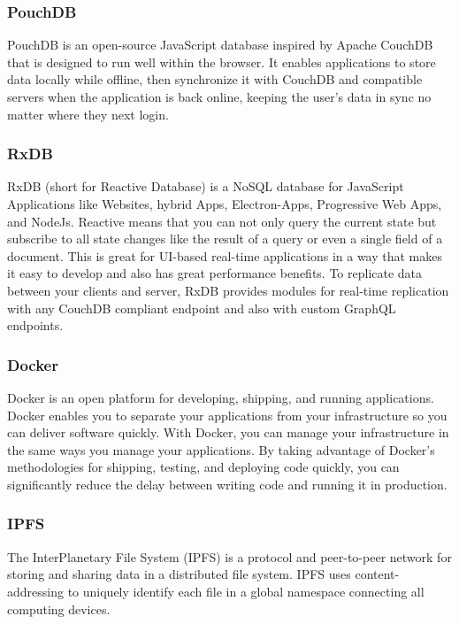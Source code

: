     \subsubsection{PouchDB}
    PouchDB is an open-source JavaScript database inspired by Apache CouchDB 
    that is designed to run well within the browser.
    It enables applications to store data locally while offline, 
    then synchronize it with CouchDB and compatible servers when the application is back online, keeping the user's data in sync 
    no matter where they next login.

    \subsubsection{RxDB}
    RxDB (short for Reactive Database) is a NoSQL database for JavaScript Applications like Websites, 
    hybrid Apps, Electron-Apps, Progressive Web Apps, and NodeJs. Reactive means that you can not only query the current state but subscribe to all state changes like the result of a query or even a 
    single field of a document. This is great for UI-based real-time applications in a way that makes it easy to develop and also has great performance benefits. To replicate data between your clients and server,
    RxDB provides modules for real-time replication with any CouchDB compliant endpoint and also with custom GraphQL endpoints. 

    \subsubsection{Docker}
    Docker is an open platform for developing, shipping, and running applications. 
    Docker enables you to separate your applications from your infrastructure so you can deliver software quickly. 
    With Docker, you can manage your infrastructure in the same ways you manage your applications. 
    By taking advantage of Docker’s methodologies for shipping, testing, and deploying code quickly, 
    you can significantly reduce the delay between writing code and running it in production.

    \subsubsection{IPFS}
    The InterPlanetary File System (IPFS) is a protocol and peer-to-peer network for storing and sharing data in a distributed file system. 
    IPFS uses content-addressing to uniquely identify each file in a global namespace connecting all computing devices.

